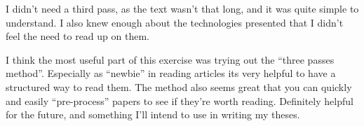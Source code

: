 I didn't need a third pass, as the text wasn't that long, and it was quite
simple to understand. I also knew enough about the technologies presented that
I didn't feel the need to read up on them.

I think the most useful part of this exercise was trying out the ``three passes
method''. Especially as ``newbie'' in reading articles its very helpful to have
a structured way to read them. The method also seems great that you can quickly
and easily ``pre-process'' papers to see if they're worth reading. Definitely
helpful for the future, and something I'll intend to use in writing my theses.
